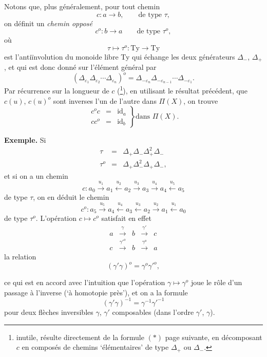 \documentclass[11pt]{article}
\newcommand{\printedpage}[1]{\marginpar{\footnotesize p.~#1}}
\newcommand{\msp}[1]{\marginpar{\footnotesize [#1]}}
\begin{document}
\printedpage{43}
\msp{page 64}
Notons que, plus généralement, pour tout chemin
\[
c : a \longrightarrow b, \qquad \text{de type } \tau,
\]
on définit un \textit{chemin opposé}
\[
c^o : b \longrightarrow a \qquad \text{de type } \tau^o,
\]
où
\[
\tau \longmapsto \tau^o : \mathrm{Ty} \longrightarrow \mathrm{Ty}
\]
est l'antiïnvolution du monoide libre Ty qui échange les deux générateurs $\Delta_-$, $\Delta_+$, et qui est donc donné sur l'élément général par
\[
(\Delta_{\varepsilon_1}\Delta_{\varepsilon_2}\cdots\Delta_{\varepsilon_n})^o = \Delta_{-\varepsilon_n}\Delta_{-\varepsilon_{n-1}}\cdots\Delta_{-\varepsilon_1}.
\]
Par récurrence sur la longueur de $c$ (\footnote[18]{inutile, résulte directement de la formule $(*)$ page suivante, en décomposant $c$ en composés de chemins `élémentaires' de type $\Delta_+$ ou $\Delta_-$.}), en utilisant le résultat précédent, que $c(u)$, $c(u)^o$ sont inverses l'un de l'autre dans $\Pi(X)$, on trouve
\[
\left.
\begin{array}{rcl}
c^o c & = & \mathrm{id}_a\\
c c^o & = & \mathrm{id}_b
\end{array}
\right\}\text{dans } \Pi(X).
\]

\textbf{Exemple.} Si
\[
\begin{array}{rcl}
\tau & = & \Delta_+\Delta_-\Delta_+^2\Delta_-\\
\tau^o & = & \Delta_+\Delta_-^2\Delta_+\Delta_-,
\end{array}
\]
et si on a un chemin
\[
c : a_0 \xrightarrow{u_1} a_1 \xleftarrow{u_2} a_2 \xrightarrow{u_3} a_3 \xrightarrow{u_4} a_4 \xleftarrow{u_5} a_5
\]
de type $\tau$, on en déduit le chemin
\[
c^o : a_5 \xrightarrow{u_5} a_4 \xleftarrow{u_4} a_3 \xleftarrow{u_3} a_2 \xrightarrow{u_2} a_1 \xleftarrow{u_1} a_0
\]
de type $\tau^o$. L'opération $c \longmapsto c^o$ satisfait en
\msp{page 65}
effet 
\[
\begin{array}{ccccc}
a & \xrightarrow{\gamma} & b & \xrightarrow{\gamma'} & c\\
c & \xrightarrow{\gamma'^o} & b & \xrightarrow{\gamma^o} & a
\end{array}
\]
la relation
\[
(\gamma'\gamma)^o = \gamma^o\gamma'^o, \tag*{$(*)$}
\]

\printedpage{44}

ce qui est en accord avec l'intuition que l'opération $\gamma \longmapsto \gamma^o$ joue le rôle d'un passage à l'inverse (`à homotopie près'), et on a la formule
\[
(\gamma'\gamma)^{-1} = \gamma^{-1}\gamma'^{-1}
\]
pour deux flèches inversibles $\gamma$, $\gamma'$ composables (dans l'ordre $\gamma'$, $\gamma$).
\end{document}
